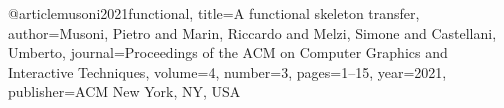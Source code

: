 @article{musoni2021functional,
  title={A functional skeleton transfer},
  author={Musoni, Pietro and Marin, Riccardo and Melzi, Simone and Castellani, Umberto},
  journal={Proceedings of the ACM on Computer Graphics and Interactive Techniques},
  volume={4},
  number={3},
  pages={1--15},
  year={2021},
  publisher={ACM New York, NY, USA}
}